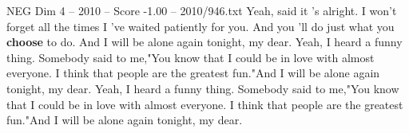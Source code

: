 \begin{textsample}{NEG Dim 4 – 2010 – Score -1.00 – 2010/946.txt}  \label{ex:f4_neg_002}
Yeah, said it 's alright.
I won't forget all the times I 've waited patiently for you.
And you 'll do just what you \textbf{choose} to do.
And I will be alone again tonight, my dear.
Yeah, I heard a funny thing.
Somebody said to me,"You know that I could be in love with almost everyone.
I think that people are the greatest fun."And I will be alone again tonight, my dear.
Yeah, I heard a funny thing.
Somebody said to me,"You know that I could be in love with almost everyone.
I think that people are the greatest fun."And I will be alone again tonight, my dear.

\end{textsample}
